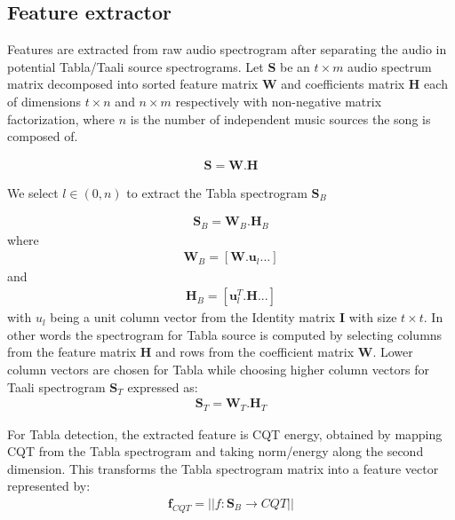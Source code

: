 \documentclass{article}
\begin{document}
\subsection{Feature extractor}

Features are extracted from raw audio spectrogram after separating the audio in potential Tabla/Taali source spectrograms. Let $\boldsymbol{S}$ be an ${t\times  m}$ audio spectrum matrix decomposed into sorted feature matrix $\boldsymbol{W}$ and coefficients matrix $\boldsymbol{H}$ each of dimensions ${t\times n}$ and ${n\times m}$ respectively with non-negative matrix factorization, where $n$ is the number of independent music sources the song is composed of.

\begin{align}\label{eq:eq1}
\boldsymbol{S} = \boldsymbol{W}.\boldsymbol{H}
\end{align}

We select $l \in (0,n)$ to extract the Tabla spectrogram $\boldsymbol{S}_{B}$ 

\begin{align}\label{eq:eq2}
\boldsymbol{S}_{B} = \boldsymbol{W}_{B}.\boldsymbol{H}_{B}
\end{align}
where
\begin{align}\label{eq:eq3}
\boldsymbol{W}_{B} = [\boldsymbol{W}.\boldsymbol{u}_{l} ...]
\end{align}
and 
\begin{align}\label{eq:eq4}
\boldsymbol{H}_{B} = [\boldsymbol{u}_{l}^T.\boldsymbol{H} ...]
\end{align}
with $u_{l}$ being a unit column vector from the Identity matrix $\boldsymbol{I}$ with size ${t\times t}$. In other words the spectrogram for Tabla source is computed
by selecting columns from the feature matrix $\boldsymbol{H}$ and rows from the coefficient matrix $\boldsymbol{W}$. Lower column vectors are chosen for Tabla while choosing higher column vectors for Taali spectrogram $\boldsymbol{S}_{T}$ expressed as:
\begin{align}\label{eq:eq5}
\boldsymbol{S}_{T} = \boldsymbol{W}_{T}.\boldsymbol{H}_{T}
\end{align}

For Tabla detection, the extracted feature is CQT energy, obtained by mapping CQT from the Tabla spectrogram and taking norm/energy along the second dimension. This transforms the Tabla spectrogram matrix into a feature vector represented by:
\begin{align}\label{eq:eq6}
\boldsymbol{f}_{CQT} = \lvert \lvert f\colon \boldsymbol{S}_{B}\to CQT \rvert \rvert
\end{align}
\end{document}
